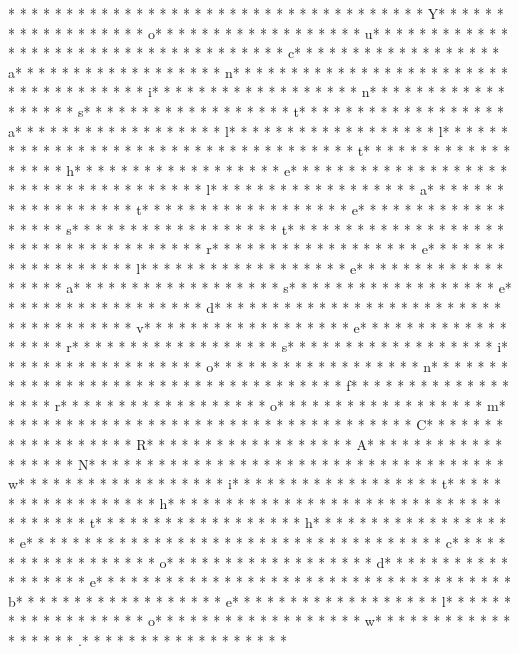 * * *  * * *  * * *  *  * * *  *  * * *  * 	* * *  * * *  * * *  *  * * *  *  * * *  * Y* * *  * * *  * * *  *  * * *  *  * * *  * o* * *  * * *  * * *  *  * * *  *  * * *  * u* * *  * * *  * * *  *  * * *  *  * * *  *  * * *  * * *  * * *  *  * * *  *  * * *  * c* * *  * * *  * * *  *  * * *  *  * * *  * a* * *  * * *  * * *  *  * * *  *  * * *  * n* * *  * * *  * * *  *  * * *  *  * * *  *  * * *  * * *  * * *  *  * * *  *  * * *  * i* * *  * * *  * * *  *  * * *  *  * * *  * n* * *  * * *  * * *  *  * * *  *  * * *  * s* * *  * * *  * * *  *  * * *  *  * * *  * t* * *  * * *  * * *  *  * * *  *  * * *  * a* * *  * * *  * * *  *  * * *  *  * * *  * l* * *  * * *  * * *  *  * * *  *  * * *  * l* * *  * * *  * * *  *  * * *  *  * * *  *  * * *  * * *  * * *  *  * * *  *  * * *  * t* * *  * * *  * * *  *  * * *  *  * * *  * h* * *  * * *  * * *  *  * * *  *  * * *  * e* * *  * * *  * * *  *  * * *  *  * * *  *  * * *  * * *  * * *  *  * * *  *  * * *  * l* * *  * * *  * * *  *  * * *  *  * * *  * a* * *  * * *  * * *  *  * * *  *  * * *  * t* * *  * * *  * * *  *  * * *  *  * * *  * e* * *  * * *  * * *  *  * * *  *  * * *  * s* * *  * * *  * * *  *  * * *  *  * * *  * t* * *  * * *  * * *  *  * * *  *  * * *  *  * * *  * * *  * * *  *  * * *  *  * * *  * r* * *  * * *  * * *  *  * * *  *  * * *  * e* * *  * * *  * * *  *  * * *  *  * * *  * l* * *  * * *  * * *  *  * * *  *  * * *  * e* * *  * * *  * * *  *  * * *  *  * * *  * a* * *  * * *  * * *  *  * * *  *  * * *  * s* * *  * * *  * * *  *  * * *  *  * * *  * e* * *  * * *  * * *  *  * * *  *  * * *  * d* * *  * * *  * * *  *  * * *  *  * * *  *  * * *  * * *  * * *  *  * * *  *  * * *  * v* * *  * * *  * * *  *  * * *  *  * * *  * e* * *  * * *  * * *  *  * * *  *  * * *  * r* * *  * * *  * * *  *  * * *  *  * * *  * s* * *  * * *  * * *  *  * * *  *  * * *  * i* * *  * * *  * * *  *  * * *  *  * * *  * o* * *  * * *  * * *  *  * * *  *  * * *  * n* * *  * * *  * * *  *  * * *  *  * * *  *  * * *  * * *  * * *  *  * * *  *  * * *  * f* * *  * * *  * * *  *  * * *  *  * * *  * r* * *  * * *  * * *  *  * * *  *  * * *  * o* * *  * * *  * * *  *  * * *  *  * * *  * m* * *  * * *  * * *  *  * * *  *  * * *  *  * * *  * * *  * * *  *  * * *  *  * * *  * C* * *  * * *  * * *  *  * * *  *  * * *  * R* * *  * * *  * * *  *  * * *  *  * * *  * A* * *  * * *  * * *  *  * * *  *  * * *  * N* * *  * * *  * * *  *  * * *  *  * * *  *  * * *  * * *  * * *  *  * * *  *  * * *  * w* * *  * * *  * * *  *  * * *  *  * * *  * i* * *  * * *  * * *  *  * * *  *  * * *  * t* * *  * * *  * * *  *  * * *  *  * * *  * h* * *  * * *  * * *  *  * * *  *  * * *  *  * * *  * * *  * * *  *  * * *  *  * * *  * t* * *  * * *  * * *  *  * * *  *  * * *  * h* * *  * * *  * * *  *  * * *  *  * * *  * e* * *  * * *  * * *  *  * * *  *  * * *  *  * * *  * * *  * * *  *  * * *  *  * * *  * c* * *  * * *  * * *  *  * * *  *  * * *  * o* * *  * * *  * * *  *  * * *  *  * * *  * d* * *  * * *  * * *  *  * * *  *  * * *  * e* * *  * * *  * * *  *  * * *  *  * * *  *  * * *  * * *  * * *  *  * * *  *  * * *  * b* * *  * * *  * * *  *  * * *  *  * * *  * e* * *  * * *  * * *  *  * * *  *  * * *  * l* * *  * * *  * * *  *  * * *  *  * * *  * o* * *  * * *  * * *  *  * * *  *  * * *  * w* * *  * * *  * * *  *  * * *  *  * * *  * .* * *  * * *  * * *  *  * * *  *  * * *  * 
